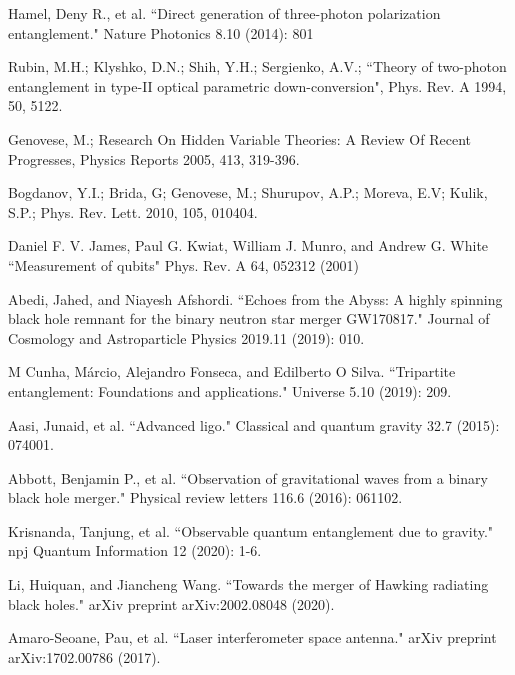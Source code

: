 \documentclass[fleqn,usenatbib]{mnras}
\begin{document}
\begin{thebibliography}{99}
Hamel, Deny R., et al. ``Direct generation of three-photon polarization entanglement." Nature Photonics 8.10 (2014): 801

Rubin, M.H.; Klyshko, D.N.; Shih, Y.H.; Sergienko, A.V.; ``Theory of two-photon entanglement in type-II optical parametric down-conversion", Phys. Rev. A 1994, 50, 5122.

Genovese, M.; Research On Hidden Variable Theories: A Review Of Recent Progresses, Physics Reports 2005, 413, 319-396.

Bogdanov, Y.I.; Brida, G; Genovese, M.; Shurupov, A.P.; Moreva, E.V; Kulik, S.P.; Phys. Rev. Lett. 2010, 105, 010404.

Daniel F. V. James, Paul G. Kwiat, William J. Munro, and Andrew G. White ``Measurement of qubits" Phys. Rev. A 64, 052312 (2001)

Abedi, Jahed, and Niayesh Afshordi. ``Echoes from the Abyss: A highly spinning black hole remnant for the binary neutron star merger GW170817." Journal of Cosmology and Astroparticle Physics 2019.11 (2019): 010.

M Cunha, Márcio, Alejandro Fonseca, and Edilberto O Silva. ``Tripartite entanglement: Foundations and applications." Universe 5.10 (2019): 209.

Aasi, Junaid, et al. ``Advanced ligo." Classical and quantum gravity 32.7 (2015): 074001.

Abbott, Benjamin P., et al. ``Observation of gravitational waves from a binary black hole merger." Physical review letters 116.6 (2016): 061102.

Krisnanda, Tanjung, et al. ``Observable quantum entanglement due to gravity." npj Quantum Information 12 (2020): 1-6.

Li, Huiquan, and Jiancheng Wang. ``Towards the merger of Hawking radiating black holes." arXiv preprint arXiv:2002.08048 (2020).

Amaro-Seoane, Pau, et al. ``Laser interferometer space antenna." arXiv preprint arXiv:1702.00786 (2017).


\end{thebibliography}
\end{document}
